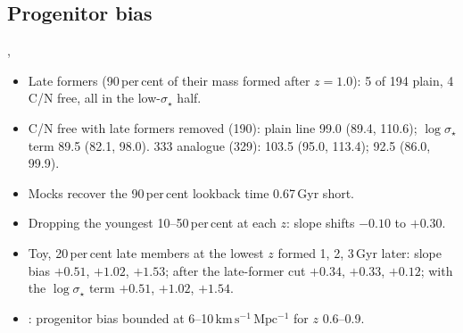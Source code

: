\documentclass[fleqn,usenatbib]{mnras}
\newcommand{\Hu}{\ensuremath{\mathrm{km\,s^{-1}\,Mpc^{-1}}}}
\newcommand{\sig}{\ensuremath{\sigma_\star}}
\begin{document}
\subsection{Progenitor bias}
, 
\begin{itemize}
\item Late formers (90\,per\,cent of their mass formed after $z=1.0$): 5 of 194 plain, 4 C/N free, all in the low-\sig{} half.
\item C/N free with late formers removed (190): plain line 99.0 (89.4, 110.6); $\log\sig$ term 89.5 (82.1, 98.0). 333 analogue (329): 103.5 (95.0, 113.4); 92.5 (86.0, 99.9).
\item Mocks recover the 90\,per\,cent lookback time 0.67\,Gyr short. 
\item Dropping the youngest 10--50\,per\,cent at each $z$: slope shifts $-0.10$ to $+0.30$. 
\item Toy, 20\,per\,cent late members at the lowest $z$ formed 1, 2, 3\,Gyr later: slope bias $+0.51$, $+1.02$, $+1.53$; after the late-former cut $+0.34$, $+0.33$, $+0.12$; with the $\log\sig$ term $+0.51$, $+1.02$, $+1.54$. 
\item \citet{Moresco2012}: progenitor bias bounded at 6--10\,\Hu{} for $z$ 0.6--0.9.
\end{itemize}
\end{document}
